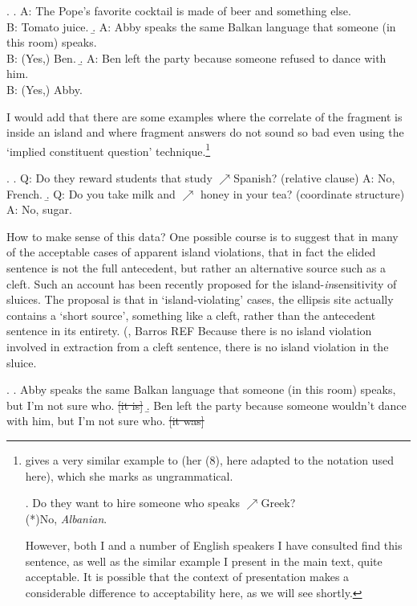 \documentclass[11pt,letterpaper]{article}
\begin{document}
\ex. 	\a. A: The Pope's favorite cocktail is made of beer and something else.\\
		B: Tomato juice.
	\b. A: Abby speaks the same Balkan language that someone (in this room) speaks.\\
		B: (Yes,) Ben.
	\b. A: Ben left the party because someone refused to dance with him.\\
		B: (Yes,) Abby.
		
I would add that there are some examples where the correlate of the fragment is inside an island and where fragment answers do not sound so bad even using the `implied constituent question' technique.\footnote{\cite{Te13} gives a very similar example to \TextNext[a] (her (8), here adapted to the notation used here), which she marks as ungrammatical.
	    
	    \ex. 	Do they want to hire someone who speaks $\nearrow$Greek?\\
	    		{}(*)No, \emph{Albanian}.
	    		
	    However, both I and a number of English speakers I have consulted find this sentence, as well as the similar example I present in the main text, quite acceptable. It is possible that the context of presentation makes a considerable difference to acceptability here, as we will see shortly.}

\ex. 	\label{ex:contextually-salient-QUDS-in-fragments-inside-islands}\a. Q: Do they reward students that study $\nearrow$Spanish? \hfill (relative clause)
	    A: No, French.
	 \b. Q: Do you take milk and $\nearrow$ honey in your tea? \hfill (coordinate structure)\\
	 	A: No, sugar.

How to make sense of this data? One possible course is to suggest that in  many of the acceptable cases of apparent island violations, that in fact the elided sentence is not the full antecedent, but rather an alternative source such as a cleft. Such an account has been recently proposed for the island-\emph{in}sensitivity of sluices. The proposal is that in `island-violating' cases, the ellipsis site actually contains a `short source', something like a cleft, rather than the antecedent sentence in its entirety. (\cite{vC10}, Barros REF %
Because there is no island violation involved in extraction from a cleft sentence, there is no island violation in the sluice.

\ex.	\a. Abby speaks the same Balkan language that someone (in this room) speaks, but I'm not sure who. \sout{[it is]}
	\b. Ben left the party because someone wouldn't dance with him, but I'm not sure who. \sout{[it was]}
\end{document}
